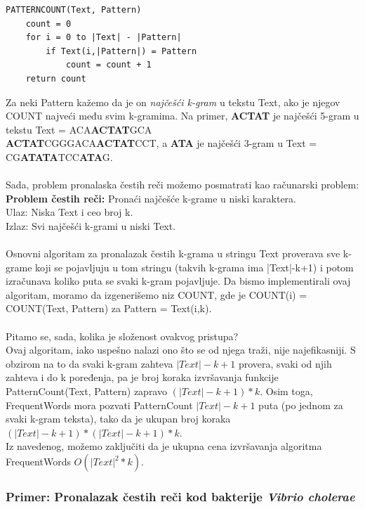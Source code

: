 \begin{lstlisting}
PATTERNCOUNT(Text, Pattern)
	count = 0
	for i = 0 to |Text| - |Pattern|
		if Text(i,|Pattern|) = Pattern
			count = count + 1 
	return count
\end{lstlisting}
	
Za neki Pattern kažemo da je on \textit{najčešći k-gram} u tekstu Text, ako je njegov COUNT najveći među svim k-gramima. Na primer, \textbf{ACTAT} je najčešći 5-gram u tekstu Text = ACA\textbf{ACTAT}GCA\\\textbf{ACTAT}CGGGACA\textbf{ACTAT}CCT, a \textbf{ATA} je najčešći 3-gram u Text = CG\textbf{ATATA}TCC\textbf{ATA}G.\\\\
Sada, problem pronalaska čestih reči možemo posmatrati kao računarski problem:\\
\textbf{Problem čestih reči:} Pronaći najčešće k-grame u niski karaktera.\\
Ulaz: Niska Text i ceo broj k.\\
Izlaz: Svi najčešći k-grami u niski Text. \\\\

Osnovni algoritam za pronalazak čestih k-grama u stringu Text proverava sve k-grame koji se pojavljuju u tom stringu (takvih k-grama ima |Text|-k+1) i potom izračunava koliko puta se svaki k-gram pojavljuje. Da bismo implementirali ovaj algoritam, moramo da izgenerišemo niz COUNT, gde je COUNT(i) = COUNT(Text, Pattern) za Pattern = Text(i,k).\\\\

Pitamo se, sada, kolika je složenost ovakvog pristupa?\\
Ovaj algoritam, iako uspešno nalazi ono što se od njega traži, nije najefikasniji. S obzirom na to da svaki k-gram zahteva $|Text|-k+1$ provera, svaki od njih zahteva i do k poređenja, pa je broj koraka izvršavanja funkcije PatternCount(Text, Pattern) zapravo $(|Text|-k+1)*k$. Osim toga, FrequentWords mora pozvati PatternCount $|Text|-k+1$ puta (po jednom za svaki k-gram teksta), tako da je ukupan broj koraka \textit{$(|Text|-k+1)*(|Text|-k+1)*k$}.\\Iz navedenog, možemo zaključiti da je ukupna cena izvršavanja algoritma FrequentWords \textbf{$O(|Text|^2*k)$}.

\subsubsection{Primer: Pronalazak čestih reči kod bakterije \textit{Vibrio cholerae}} 

